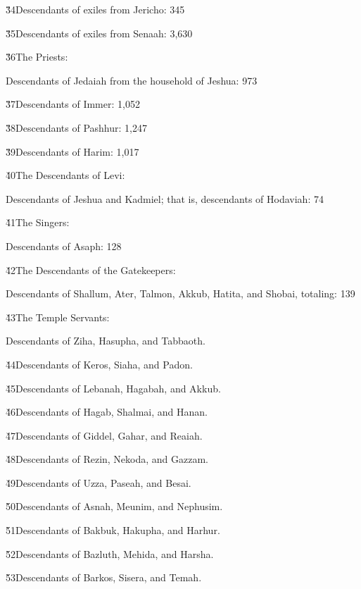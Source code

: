 \v{34}Descendants of exiles from Jericho: 345

\v{35}Descendants of exiles from Senaah: 3,630

\v{36}The Priests:

Descendants of Jedaiah from the household of Jeshua: 973

\v{37}Descendants of Immer: 1,052

\v{38}Descendants of Pashhur: 1,247

\v{39}Descendants of Harim: 1,017

\v{40}The Descendants of Levi:

Descendants of Jeshua and Kadmiel; that is, descendants of Hodaviah: 74

\v{41}The Singers:

Descendants of Asaph: 128

\v{42}The Descendants of the Gatekeepers:

Descendants of Shallum, Ater, Talmon, Akkub, Hatita, and Shobai, totaling: 139

\v{43}The Temple Servants:

Descendants of Ziha, Hasupha, and Tabbaoth.

\v{44}Descendants of Keros, Siaha, and Padon.

\v{45}Descendants of Lebanah, Hagabah, and Akkub.

\v{46}Descendants of Hagab, Shalmai, and Hanan.

\v{47}Descendants of Giddel, Gahar, and Reaiah.

\v{48}Descendants of Rezin, Nekoda, and Gazzam.

\v{49}Descendants of Uzza, Paseah, and Besai.

\v{50}Descendants of Asnah, Meunim, and Nephusim.

\v{51}Descendants of Bakbuk, Hakupha, and Harhur.

\v{52}Descendants of Bazluth, Mehida, and Harsha.

\v{53}Descendants of Barkos, Sisera, and Temah.

